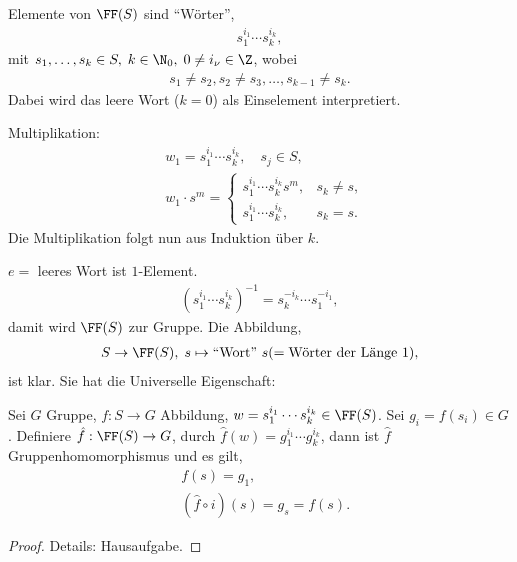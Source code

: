 \begin{propn}
Elemente von $\FF(S)$ sind ``Wörter'',
\begin{align*}
s_1^{i_1}\cdots s_k^{i_k},
\end{align*}
mit $s_1,\ldots,s_k\in S,\; k\in\N_0,\; 0\neq i_\nu\in\Z$, wobei
\begin{align*}
s_1\neq s_2, s_2\neq s_3,\ldots,s_{k-1}\neq s_k.
\end{align*}
Dabei wird das leere Wort ($k=0$) als Einselement interpretiert.

Multiplikation:
\begin{align*}
&w_1 = s_1^{i_1}\cdots s_k^{i_k},\quad s_j\in S,\\
&w_1\cdot s^m = \begin{cases}
s_1^{i_1}\cdots s_k^{i_k}s^m, & s_k\neq s,\\
s_1^{i_1}\cdots s_k^{i_k}, & s_k= s.
\end{cases}
\end{align*}
Die Multiplikation folgt nun aus Induktion über $k$.

$e=$ leeres Wort ist $1$-Element.
\begin{align*}
(s_1^{i_1}\cdots s_k^{i_k})^{-1} = s_k^{-i_k}\cdots s_1^{-i_1},
\end{align*}
damit wird $\FF(S)$ zur Gruppe. Die Abbildung,
\begin{align*}
S\to \FF(S),\; s\mapsto \text{``Wort'' }s (=\text{Wörter der Länge }1),
\end{align*}
ist klar. Sie hat die Universelle Eigenschaft:

Sei $G$ Gruppe, $f:S\to G$ Abbildung, $w=s_1^{i_1}\cdots s_k^{i_k}\in \FF(S)$.
Sei $g_i=f(s_i)\in G$. Definiere $\hat{f}: \FF(S) \to G$, durch $\hat{f}(w) =
g_1^{i_1}\cdots g_k^{i_k}$, dann ist $\hat{f}$ Gruppenhomomorphismus und es
gilt,
\begin{align*}
&f(s) = g_1,\\
&(\hat{f}\circ i)(s) = g_s = f(s).
\end{align*}
\fishhere
\end{propn}
\begin{proof}
Details: Hausaufgabe.\qedhere
\end{proof}

